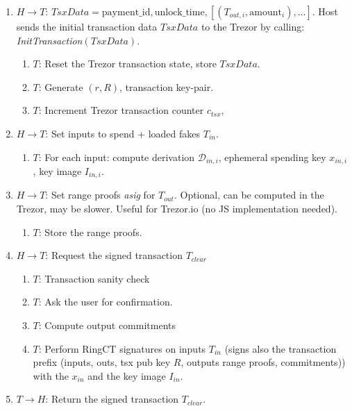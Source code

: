 \documentclass[]{article}
\begin{document}
\begin{enumerate}
	\item $H \rightarrow T$: $TsxData = \text{payment\_id},\text{unlock\_time},  \left[\left(T_{out,i}, \text{amount}_i \right), \dots \right]$. Host sends the initial transaction data $TsxData$ to the Trezor by calling: \emph{InitTransaction}$\left(TsxData\right)$.
	
	\begin{enumerate}
		\item $T$: Reset the Trezor transaction state, store $TsxData$.
		
		\item $T$: Generate $(r, R)$, transaction key-pair.
		
		\item $T$: Increment Trezor transaction counter $c_{tsx}$,
	\end{enumerate}
	
	\item $H \rightarrow T$: Set inputs to spend + loaded fakes $T_{in}$. 
	\begin{enumerate}
		\item $T$: For each input: compute derivation $\mathcal{D}_{in,i}$, ephemeral spending key $x_{in,i}$, key image $I_{in,i}$.
	\end{enumerate}
	
	\item $H \rightarrow T$: Set range proofs \emph{asig} for $T_{out}$. Optional, can be computed in the Trezor, may be slower. Useful for Trezor.io (no JS implementation needed).
	\begin{enumerate}
		\item $T$: Store the range proofs.
	\end{enumerate}
	
	\item $H \rightarrow T$: Request the signed transaction $T_{clear}$
	\begin{enumerate}
		\item $T$: Transaction sanity check
		
        \item $T$: Ask the user for confirmation.

		\item $T$: Compute output commitments
		
		\item $T$: Perform RingCT signatures on inputs $T_{in}$ (signs also the transaction prefix (inputs, outs, tsx pub key $R$, outputs range proofs, commitments)) with the $x_{in}$ and the key image $I_{in}$.
	\end{enumerate} 
	
	\item $T \rightarrow H$: Return the signed transaction $T_{clear}$.
\end{enumerate}
\end{document}
